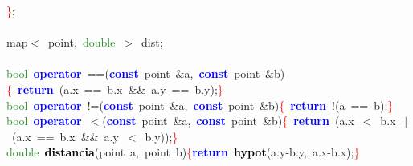 \documentclass[10pt,a4paper,twoside]{article}
\begin{document}
{{{{{\mbox{}\textcolor{Red}{\}}\textcolor{BrickRed}{;} \\
\mbox{} \\
\mbox{}map\textcolor{BrickRed}{$<$}\ point\textcolor{BrickRed}{,}\ \textcolor{ForestGreen}{double}\ \textcolor{BrickRed}{$>$}\ dist\textcolor{BrickRed}{;} \\
\mbox{} \\
\mbox{}\textcolor{ForestGreen}{bool}\ \textbf{\textcolor{Blue}{operator}}\ \textcolor{BrickRed}{==(}\textbf{\textcolor{Blue}{const}}\ point\ \textcolor{BrickRed}{\&}a\textcolor{BrickRed}{,}\ \textbf{\textcolor{Blue}{const}}\ point\ \textcolor{BrickRed}{\&}b\textcolor{BrickRed}{)}\textcolor{Red}{\{}\ \textbf{\textcolor{Blue}{return}}\ \textcolor{BrickRed}{(}a\textcolor{BrickRed}{.}x\ \textcolor{BrickRed}{==}\ b\textcolor{BrickRed}{.}x\ \textcolor{BrickRed}{\&\&}\ a\textcolor{BrickRed}{.}y\ \textcolor{BrickRed}{==}\ b\textcolor{BrickRed}{.}y\textcolor{BrickRed}{);}\textcolor{Red}{\}} \\
\mbox{}\textcolor{ForestGreen}{bool}\ \textbf{\textcolor{Blue}{operator}}\ \textcolor{BrickRed}{!=(}\textbf{\textcolor{Blue}{const}}\ point\ \textcolor{BrickRed}{\&}a\textcolor{BrickRed}{,}\ \textbf{\textcolor{Blue}{const}}\ point\ \textcolor{BrickRed}{\&}b\textcolor{BrickRed}{)}\textcolor{Red}{\{}\ \textbf{\textcolor{Blue}{return}}\ \textcolor{BrickRed}{!(}a\ \textcolor{BrickRed}{==}\ b\textcolor{BrickRed}{);}\textcolor{Red}{\}} \\
\mbox{}\textcolor{ForestGreen}{bool}\ \textbf{\textcolor{Blue}{operator}}\ \textcolor{BrickRed}{$<$(}\textbf{\textcolor{Blue}{const}}\ point\ \textcolor{BrickRed}{\&}a\textcolor{BrickRed}{,}\ \textbf{\textcolor{Blue}{const}}\ point\ \textcolor{BrickRed}{\&}b\textcolor{BrickRed}{)}\textcolor{Red}{\{}\ \textbf{\textcolor{Blue}{return}}\ \textcolor{BrickRed}{(}a\textcolor{BrickRed}{.}x\ \textcolor{BrickRed}{$<$}\ b\textcolor{BrickRed}{.}x\ \textcolor{BrickRed}{$||$}\ \textcolor{BrickRed}{(}a\textcolor{BrickRed}{.}x\ \textcolor{BrickRed}{==}\ b\textcolor{BrickRed}{.}x\ \textcolor{BrickRed}{\&\&}\ a\textcolor{BrickRed}{.}y\ \textcolor{BrickRed}{$<$}\ b\textcolor{BrickRed}{.}y\textcolor{BrickRed}{));}\textcolor{Red}{\}} \\
\mbox{}\textcolor{ForestGreen}{double}\ \textbf{\textcolor{Black}{distancia}}\textcolor{BrickRed}{(}point\ a\textcolor{BrickRed}{,}\ point\ b\textcolor{BrickRed}{)}\textcolor{Red}{\{}\textbf{\textcolor{Blue}{return}}\ \textbf{\textcolor{Black}{hypot}}\textcolor{BrickRed}{(}a\textcolor{BrickRed}{.}y\textcolor{BrickRed}{-}b\textcolor{BrickRed}{.}y\textcolor{BrickRed}{,}\ a\textcolor{BrickRed}{.}x\textcolor{BrickRed}{-}b\textcolor{BrickRed}{.}x\textcolor{BrickRed}{);}\textcolor{Red}{\}} \\
}}}}}
\end{document}
